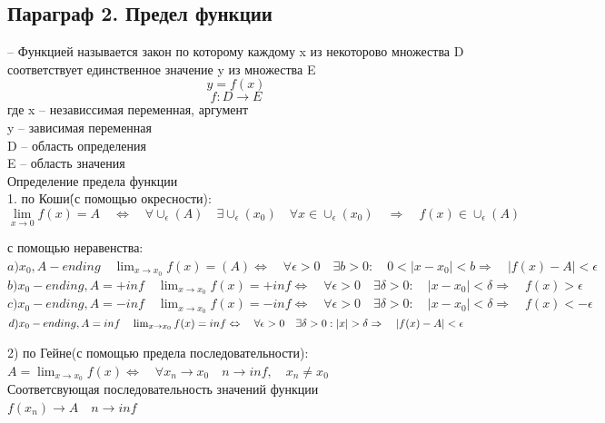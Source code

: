 \documentclass[a4paper, 12pt]{article}
\begin{document}
\subsection{Параграф 2. Предел функции}
-- Функцией называется закон по которому каждому x из некоторово множества D соответствует единственное значение y из множества E\\
\[
 y = f(x)	
\]
\[
 f: D \to E	
\]
где x -- независсимая переменная, аргумент\\
y -- зависимая переменная\\
D -- область определения\\
E -- область значения\\


       Определение предела функции\\
       1. по Коши\' (с помощью окресности):
       \[
        \lim_{x\to 0} f(x)  = A \quad \Leftrightarrow \quad \forall \cup_\epsilon (A) \quad \exists \cup_\epsilon (x_0)  \quad \forall x \in \cup_\epsilon (x_0) \quad \Rightarrow \quad f(x) \in \cup_\epsilon (A)	
        \] 

        с помощью неравенства:\\$
        a) x_0, A - ending \quad \lim_{x\to x_0} f(x) = (A) \Leftrightarrow \quad \forall \epsilon > 0 \quad \exists b > 0: \quad 0 < |x-x_0| < b \Rightarrow \quad |f(x) - A| < \epsilon 	
        $\\
        $
        b)x_0 - ending, A = +inf \quad \lim_{x\to x_0} f(x) = +inf \Leftrightarrow \quad \forall \epsilon > 0 \quad \exists \delta > 0 : \quad |x-x_0|< \delta \Rightarrow \quad f(x) > \epsilon 	
        $\\
        $
        c)x_0 - ending, A = -inf \quad \lim_{x\to x_0} f(x) = -inf \Leftrightarrow \quad \forall \epsilon > 0 \quad \exists \delta > 0 : \quad |x-x_0|< \delta \Rightarrow \quad f(x) < - \epsilon	
        $\\
        $
        d)x_0 - ending, A = inf \quad \lim_{x\to x_0} f(x) = inf \Leftrightarrow \quad \forall \epsilon > 0 \quad \exists \delta > 0 :\\ |x|> \delta \Rightarrow \quad |f(x)-A| <  \epsilon	
        $

        2) по Гейне(с помощью предела последовательности):\\
        $
        A = \lim_{x\to x_0} f(x) \Leftrightarrow \quad \forall {x_n} \to x_0 \quad n \to inf, \quad {x_n} \neq x_0	
        $\\
        Соответсвующая последовательность значений функции\\ ${f(x_n)} \to A \quad n \to inf$
\end{document}
